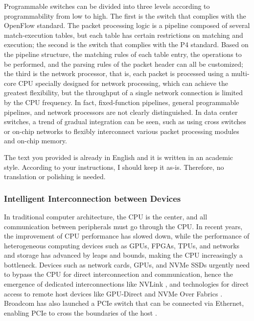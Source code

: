 Programmable switches can be divided into three levels according to programmability from low to high. The first is the switch that complies with the OpenFlow standard. The packet processing logic is a pipeline composed of several match-execution tables, but each table has certain restrictions on matching and execution; the second is the switch that complies with the P4 standard. Based on the pipeline structure, the matching rules of each table entry, the operations to be performed, and the parsing rules of the packet header can all be customized; the third is the network processor, that is, each packet is processed using a multi-core CPU specially designed for network processing, which can achieve the greatest flexibility, but the throughput of a single network connection is limited by the CPU frequency. In fact, fixed-function pipelines, general programmable pipelines, and network processors are not clearly distinguished. In data center switches, a trend of gradual integration can be seen, such as using cross switches or on-chip networks to flexibly interconnect various packet processing modules and on-chip memory.

The text you provided is already in English and it is written in an academic style. According to your instructions, I should keep it as-is. Therefore, no translation or polishing is needed.

\subsubsection{Intelligent Interconnection between Devices}

In traditional computer architecture, the CPU is the center, and all communication between peripherals must go through the CPU. In recent years, the improvement of CPU performance has slowed down, while the performance of heterogeneous computing devices such as GPUs, FPGAs, TPUs, and networks and storage has advanced by leaps and bounds, making the CPU increasingly a bottleneck. Devices such as network cards, GPUs, and NVMe SSDs urgently need to bypass the CPU for direct interconnection and communication, hence the emergence of dedicated interconnections like NVLink \cite{foley2017ultra}, and technologies for direct access to remote host devices like GPU-Direct \cite{gpu-direct} and NVMe Over Fabrics \cite{minturn2015nvm}. Broadcom has also launched a PCIe switch that can be connected via Ethernet, enabling PCIe to cross the boundaries of the host \cite{broadcom-expressfabric}.

